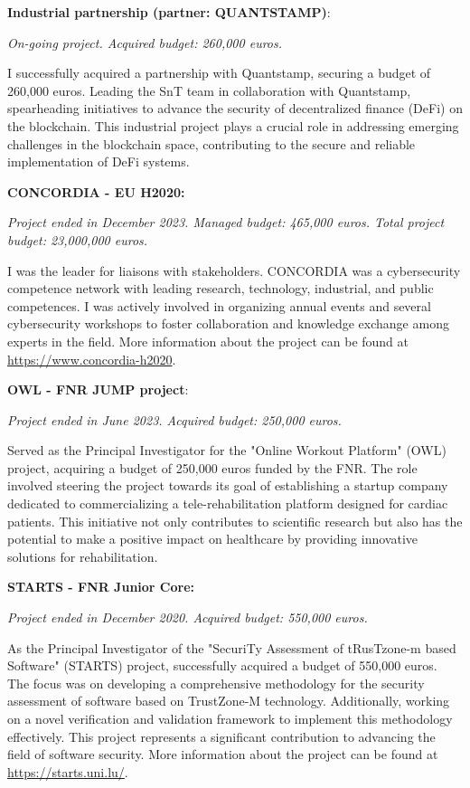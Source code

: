 \documentclass[margin,line]{resume}
\begin{document}
\begin{resume}
\begin{list2}
	\item \filbreak\textbf{Industrial partnership (partner: QUANTSTAMP)}: 
	
	\emph{On-going project. Acquired budget: 260,000 euros.}
	
	I successfully acquired a partnership with Quantstamp, securing a budget of 260,000 euros. Leading the SnT team in collaboration with Quantstamp, spearheading initiatives to advance the security of decentralized finance (DeFi) on the blockchain. This industrial project plays a crucial role in addressing emerging challenges in the blockchain space, contributing to the secure and reliable implementation of DeFi systems. 
		
	\item \filbreak\textbf{CONCORDIA - EU H2020:} 
	
	\emph{Project ended in December 2023. Managed budget: 465,000 euros. Total project budget: 23,000,000 euros.}
	
	I was the leader for liaisons with stakeholders. CONCORDIA was a cybersecurity competence network with leading research, technology, industrial, and public competences. I was actively involved in organizing annual events and several cybersecurity workshops to foster collaboration and knowledge exchange among experts in the field. More information about the project can be found at \url{https://www.concordia-h2020}.
	
	\item \filbreak\textbf{OWL - FNR JUMP project}: 
	
	\emph{Project ended in June 2023. Acquired budget: 250,000 euros.}
		
	Served as the Principal Investigator for the "Online Workout Platform" (OWL) project, acquiring a budget of 250,000 euros funded by the FNR. The role involved steering the project towards its goal of establishing a startup company dedicated to commercializing a tele-rehabilitation platform designed for cardiac patients. This initiative not only contributes to scientific research but also has the potential to make a positive impact on healthcare by providing innovative solutions for rehabilitation. 
	
	\item \filbreak\textbf{STARTS - FNR Junior Core:} 
	
	\emph{Project ended in December 2020. Acquired budget: 550,000 euros.}
	
	As the Principal Investigator of the "SecuriTy Assessment of tRusTzone-m based Software" (STARTS) project, successfully acquired a budget of 550,000 euros. The focus was on developing a comprehensive methodology for the security assessment of software based on TrustZone-M technology. Additionally, working on a novel verification and validation framework to implement this methodology effectively. This project represents a significant contribution to advancing the field of software security. More information about the project can be found at \url{https://starts.uni.lu/}. 


\end{list2}
\end{resume}
\end{document}
